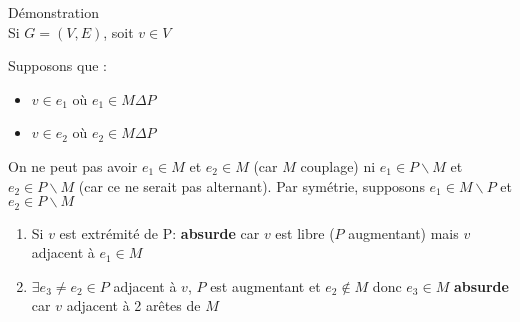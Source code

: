 \documentclass[varwidth = 10cm]{standalone}
\begin{document}
{Démonstration} \\
Si $G = (V, E)$, soit $ v \in V $

Supposons que :
\begin{itemize}
    \item $ v \in e_1$ où $e_1 \in M \Delta P $
    \item $ v \in e_2$ où $e_2 \in M \Delta P $
\end{itemize}

On ne peut pas avoir $ e_1 \in M $ et $ e_2 \in M $ (car $M$ couplage) ni $e_1 \in P \backslash M$ et $e_2 \in P \backslash M$ (car ce ne serait pas alternant).
Par symétrie, supposons $ e_1 \in M \backslash P $ et $ e_2 \in P \backslash M $

\begin{enumerate}
    \item Si $v$ est extrémité de P: \textbf{absurde} car $v$ est libre ($P$ augmentant)
    mais $v$ adjacent à $e_1 \in M$    
    \item $ \exists e_3 \neq e_2 \in P$ adjacent à $v$, $P$ est augmentant et $e_2 \notin M$ donc $e_3 \in M$
    \textbf{absurde} car $v$ adjacent à 2 arêtes de $M$
\end{enumerate}
\end{document}
